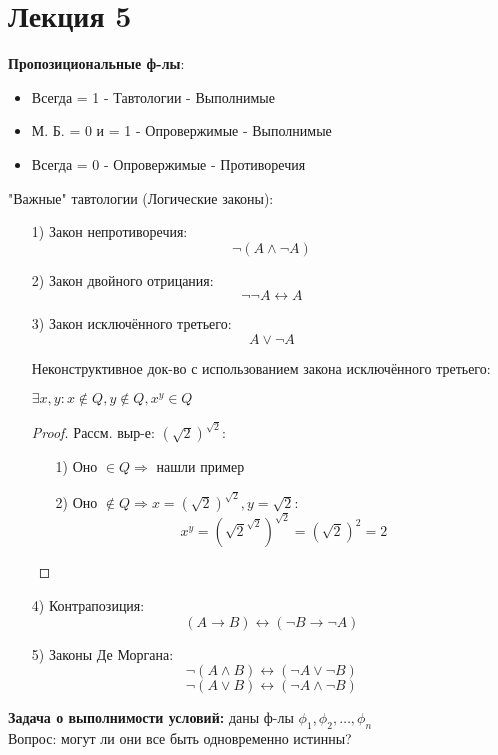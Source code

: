 \section{Лекция 5}
\textbf{Пропозициональные ф-лы}:
\begin{itemize}
  \item Всегда = 1 - Тавтологии - Выполнимые 
  \item М. Б. = 0 и = 1 - Опровержимые - Выполнимые 
  \item Всегда = 0 - Опровержимые - Противоречия
\end{itemize}
"Важные" тавтологии (Логические законы):
\begin{itemize}
  \item [1) ] Закон непротиворечия: 
    \[
    \neg(A \land \neg A)
    \]
  \item [2) ] Закон двойного отрицания:
    \[
    \neg\neg A \leftrightarrow A
    \]
  \item [3) ] Закон исключённого третьего: \[
    A \lor \neg A
  \]
  \begin{example}
  Неконструктивное док-во с использованием закона исключённого третьего:
  \begin{theorem}
  $\exists x, y \colon x \not\in Q, y \not\in Q, x^{y} \in Q$
  \end{theorem}
  \begin{proof}
  Рассм. выр-е: $(\sqrt{2})^{\sqrt{2}}$:
  \begin{itemize}
    \item [1) ] Оно $\in Q \Rightarrow$ нашли пример
    \item [2) ] Оно $\not\in Q \Rightarrow x = (\sqrt{2})^{\sqrt{2}}, y = \sqrt{2}$:
      \[
      x^{y} = (\sqrt{2}^{\sqrt{2}})^{\sqrt{2}} = (\sqrt{2})^{2} = 2
      \]
  \end{itemize}
  \end{proof}
  \end{example}
\item [4) ] Контрапозиция:
  \[
    (A \rightarrow B) \leftrightarrow (\neg B \rightarrow \neg A)
  \]
\item [5) ] Законы Де Моргана:
  \[
  \neg(A \land B) \leftrightarrow (\neg A \lor \neg B)
  \]
  \[
  \neg(A \lor B) \leftrightarrow (\neg A \land \neg B)
  \]
\end{itemize}
\textbf{Задача о выполнимости условий:} даны ф-лы $\phi_1, \phi_2, \ldots, \phi_n$ \\

Вопрос: могут ли они все быть одновременно истинны? \\

